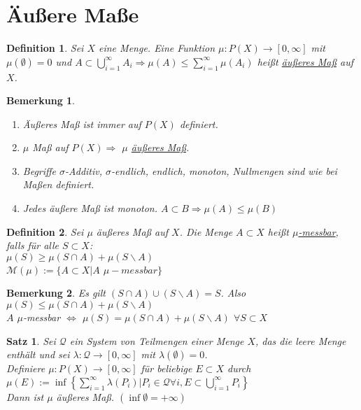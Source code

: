 \documentclass[11pt]{memoir}
\theoremstyle{changebreak}
\newtheorem{Definition}{Definition}[chapter]
\newtheorem{Bemerkung}{Bemerkung}[chapter]
\newtheorem{Satz}{Satz}[chapter]
\begin{document}
\section{Äußere Maße}

\begin{Definition}
Sei $X$ eine Menge. Eine Funktion $\mu: P(X) \rightarrow [0, \infty]$ mit $\mu(\emptyset) = 0$ und $A \subset \bigcup\limits_{i=1}^\infty A_i \Rightarrow \mu(A) \leq \sum\limits_{i=1}^\infty \mu(A_i)$ heißt \underline{äußeres Maß} auf $X$.
\end{Definition}

\begin{Bemerkung}
\begin{enumerate}
	\item Äußeres Maß ist immer auf $P(X)$ definiert.
	\item $\mu$ Maß auf $P(X) \Rightarrow$ $\mu$ \underline{äußeres Maß}.
	\item Begriffe $\sigma$-Additiv, $\sigma$-endlich, endlich, monoton, Nullmengen sind wie bei Maßen definiert.
	\item Jedes äußere Maß ist monoton. $A \subset B \Rightarrow \mu(A) \leq \mu(B)$
\end{enumerate}
\end{Bemerkung}

\begin{Definition}
Sei $\mu$ äußeres Maß auf $X$. Die Menge $A \subset X$ heißt \underline{$\mu$-messbar}, falls für alle $S \subset X$: \\
$\mu(S) \geq \mu(S \cap A) + \mu(S \backslash A)$ \\
$\mathscr M(\mu):= \{ A \subset X | A$ $ \mu-messbar \}$
\end{Definition}

\begin{Bemerkung}
Es gilt $(S \cap A) \cup (S \backslash A) = S$. Also $\mu(S) \leq \mu(S \cap A) + \mu(S \backslash A)$ \\
$A$ $\mu$-messbar $\Leftrightarrow$ $\mu(S) = \mu(S \cap A) + \mu(S \backslash A)$ $\forall S \subset X$
\end{Bemerkung}

\begin{Satz}
Sei $\mathscr Q$ ein System von Teilmengen einer Menge $X$, das die leere Menge enthält und sei $\lambda: \mathscr Q \rightarrow [0, \infty]$ mit $\lambda(\emptyset) = 0$.\\
Definiere $\mu: P(X) \rightarrow [0, \infty]$ für beliebige $E \subset X$ durch \\
 $\mu(E) := \inf \left\lbrace \sum\limits_{i=1}^\infty \lambda(P_i) | P_i \in \mathscr Q \forall i, E \subset \bigcup\limits_{i=1}^\infty P_i \right\rbrace$ \\
Dann ist $\mu$ äußeres Maß. $(\inf \emptyset = + \infty)$
\end{Satz}
\end{document}
